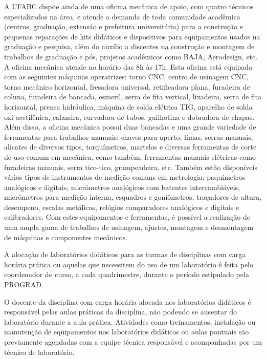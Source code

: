 A UFABC dispõe ainda de uma oficina mecânica de apoio, com quatro técnicos
especializados na área, e atende a demanda de toda comunidade acadêmica
(centros, graduação, extensão e prefeitura universitária) para a construção e
pequenas reparações de kits didáticos e dispositivos para equipamentos usados
na graduação e pesquisa, além do auxílio a discentes na construção e montagem de
trabalhos de graduação e pós, projetos acadêmicos como BAJA, Aerodesign, etc.
A oficina mecânica atende no horário das 8h às 17h.
Esta oficina está equipada com as seguintes máquinas operatrizes: torno CNC,
centro de usinagem CNC, torno mecânico horizontal, fresadora universal,
retificadora plana, furadeira de coluna, furadeira de bancada, esmeril, serra
de fita vertical, lixadeira, serra de fita horizontal, prensa hidráulica,
máquina de solda elétrica TIG, aparelho de solda oxi-acetilênica, calandra,
curvadora de tubos, guilhotina e dobradora de chapas. 
Além disso, a oficina mecânica possui duas bancadas e uma grande variedade de
ferramentas para trabalhos manuais: chaves para aperto, limas, serras manuais,
alicates de diversos tipos, torquímetros, martelos e diversas ferramentas de
corte de uso comum em mecânica, como também, ferramentas manuais elétricas como
furadeiras manuais, serra tico-tico, grampeadeira, etc. 
Também estão disponíveis vários tipos de instrumentos de medição comuns em
metrologia: paquímetros analógicos e digitais, micrômetros analógicos com
batentes intercambiáveis, micrômetros para medição interna, esquadros e
goniômetros, traçadores de altura, desempeno, escalas metálicas, relógios
comparadores analógicos e digitais e calibradores.
Com estes equipamentos e ferramentas, é possível a realização de uma ampla gama
de trabalhos de usinagem, ajustes, montagem e desmontagem de máquinas e
componentes mecânicos.

A alocação de laboratórios didáticos para as turmas de disciplinas com carga
horária prática ou aquelas que necessitem do uso de um laboratório é feita pelo
coordenador do curso, a cada quadrimestre, durante o período estipulado pela
PROGRAD.

O docente da disciplina com carga horária alocada nos laboratórios didáticos é
responsável pelas aulas práticas da disciplina, não podendo se ausentar do
laboratório durante a aula prática.
Atividades como treinamentos, instalação ou manutenção de equipamentos nos
laboratórios didáticos ou aulas pontuais são previamente agendadas com a equipe
técnica responsável e acompanhadas por um técnico de laboratório.

